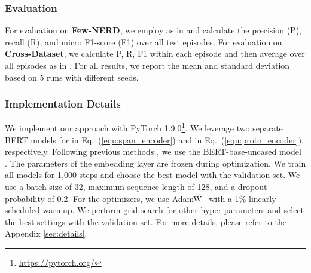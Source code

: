 \documentclass[11pt]{article}
\begin{document}
\subsubsection{Evaluation}
For evaluation on \textbf{Few-NERD}, we employ  as in \citet{ding2021nerd} and calculate the precision (P), recall (R), and micro F1-score (F1) over all test episodes.
For evaluation on \textbf{Cross-Dataset}, we calculate P, R, F1 within each episode and then average over all episodes as in \citet{hou2020few}.
For all results, we report the mean and standard deviation based on 5 runs with different seeds. 

\subsubsection{Implementation Details}
We implement our approach with PyTorch 1.9.0\footnote{\url{https://pytorch.org/}}. We leverage two separate BERT models for  in Eq.~(\ref{equ:span_encoder}) and  in Eq.~(\ref{equ:proto_encoder}), respectively. Following previous methods \citep{hou2020few, ding2021nerd}, we use the BERT-base-uncased model \citep{devlin2019bert}.  
The parameters of the embedding layer are frozen during optimization.
We train all models for 1,000 steps and choose the best model with the validation set. We use a batch size of 32, maximum sequence length of 128, and a dropout probability of 0.2.
For the optimizers, we use AdamW~\citep{loshchilov2018decoupled} with a 1\% linearly scheduled warmup.
We perform grid search for other hyper-parameters and select the best settings with the validation set.
For more details, please refer to the Appendix \ref{sec:details}.
\end{document}
